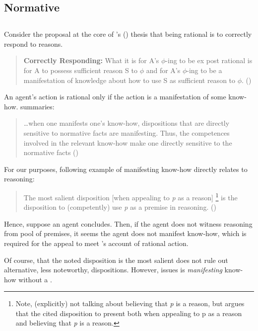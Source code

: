 \subsection{Normative}

\subsection{\textcite{Lord:2018aa}}

\begin{note}
  Consider the proposal at the core of \citeauthor{Lord:2018aa}'s (\citeyear{Lord:2018aa}) thesis that being rational is to correctly respond to reasons.

  \begin{quote}
    \textbf{Correctly Responding:} What it is for A's \(\phi\)-ing to be ex post rational is for A to possess sufficient reason S to \(\phi\) and for A's \(\phi\)-ing to be a manifestation of knowledge about how to use S as sufficient reason to \(\phi\).%
    \mbox{}\hfill\mbox{(\citeyear[143]{Lord:2018aa})}
  \end{quote}

  An agent's action is rational only if the action is a manifestation of some know-how.
  \citeauthor{Lord:2018aa} summaries:

  \begin{quote}
    \dots when one manifests one's know-how, dispositions that are directly sensitive to normative facts are manifesting. Thus, the competences involved in the relevant know-how make one directly sensitive to the normative facts%
    \mbox{}\hfill\mbox{(\citeyear[16]{Lord:2018aa})}
  \end{quote}

  For our purposes, following example of manifesting know-how directly relates to reasoning:

  \begin{quote}
    The most salient disposition [when appealing to \emph{p} as a reason]%
    \footnote{
      Note, \citeauthor{Lord:2018aa} (explicitly) not talking about believing that \emph{p} is a reason, but argues that the cited disposition to present both when appealing to p as a reason and believing that \emph{p} is a reason.
    }
    is the disposition to (competently) use \emph{p} as a premise in reasoning.\newline
    \mbox{}\hfill\mbox{(\citeyear[25]{Lord:2018aa})}
  \end{quote}

  Hence, suppose an agent concludes.
  Then, if the agent does not witness reasoning from pool of premises, it seems the agent does not manifest know-how, which is required for the appeal to meet \citeauthor{Lord:2018aa}'s account of rational action.

  Of course, that the noted disposition is the most salient does not rule out alternative, less noteworthy, dispositions.
  However, issues is \emph{manifesting} know-how without a \wit{}.
\end{note}

